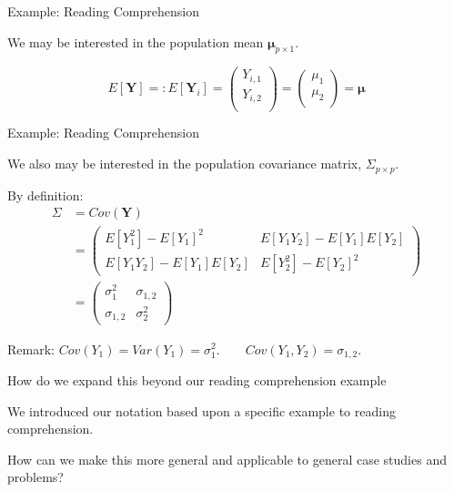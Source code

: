 \documentclass[
  ignorenonframetext,
]{beamer}
\newcommand{\bmu}{\bm{\mu}}
\begin{document}
\begin{frame}{Example: Reading Comprehension}
\protect\hypertarget{example-reading-comprehension-2}{}

We may be interested in the population mean \(\bmu_{p \times 1}.\)

\[
E[\bm{Y}] =: E[\bm{Y}_{i}] = \left( \begin{array}{c}
Y_{i,1}\\
Y_{i,2}\\
\end{array} \right) 
=  \left( \begin{array}{c}
\mu_1\\
\mu_2\\
\end{array} \right) 
= 
\bmu
\]

\end{frame}

\begin{frame}{Example: Reading Comprehension}
\protect\hypertarget{example-reading-comprehension-3}{}

We also may be interested in the population covariance matrix,
\(\Sigma_{p \times p}.\)

By definition: \begin{align}
\Sigma  
&= Cov(\bm{Y})\\
&=
\left( \begin{array}{cccc}
E[Y_1^2] - E[Y_1]^2 & E[Y_1Y_2] - E[Y_1]E[Y_2] \\
E[Y_1Y_2] - E[Y_1]E[Y_2] & E[Y_2^2] - E[Y_2]^2
\end{array} \right)\\
&=
\left( \begin{array}{cccc}
\sigma_1^2 & \sigma_{1,2} \\
\sigma_{1,2} & \sigma_2^2
\end{array} \right)
\end{align}

Remark:
\(Cov(Y_1) = Var(Y_1) = \sigma_1^2. \qquad Cov(Y_1, Y_2) = \sigma_{1,2}.\)

\end{frame}

\begin{frame}{How do we expand this beyond our reading comprehension
example}
\protect\hypertarget{how-do-we-expand-this-beyond-our-reading-comprehension-example}{}

We introduced our notation based upon a specific example to reading
comprehension.

How can we make this more general and applicable to general case studies
and problems?

\end{frame}
\end{document}
